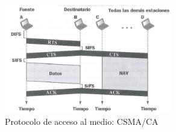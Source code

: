 \documentclass{article}
\begin{document}
\begin{figure}[h]
    \centering
    \includegraphics[width=0.65\textwidth]{img-t5/img_369_04.png}
    \caption{Protocolo de acceso al medio: CSMA/CA}
\end{figure}

\end{document}
